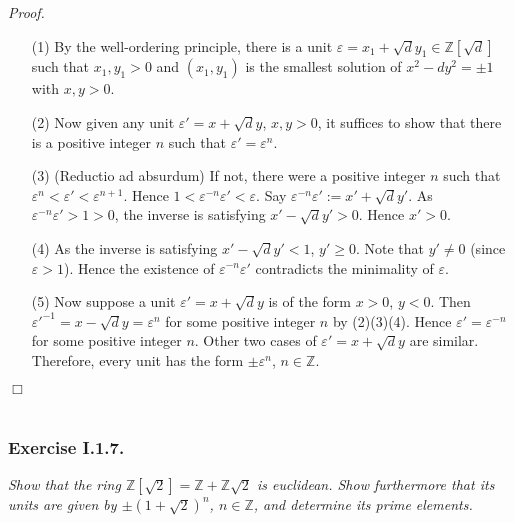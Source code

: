 \documentclass{article}
\begin{document}
\emph{Proof.}
\begin{enumerate}
\item[(1)]
  By the well-ordering principle,
  there is a unit $\varepsilon = x_1 + \sqrt{d}y_1 \in \mathbb{Z}[\sqrt{d}]$ such that
  $x_1, y_1 > 0$ and $(x_1,y_1)$ is the smallest solution of $x^2 - dy^2 = \pm 1$ with $x, y > 0$.

\item[(2)]
  Now given any unit $\varepsilon' = x + \sqrt{d}y$, $x, y > 0$,
  it suffices to show that there is a positive integer $n$ such that $\varepsilon' = \varepsilon^n$.

\item[(3)]
  (Reductio ad absurdum)
  If not, there were a positive integer $n$ such that $\varepsilon^n < \varepsilon' < \varepsilon^{n+1}$.
  Hence $1 < \varepsilon^{-n} \varepsilon' < \varepsilon$.
  Say $\varepsilon^{-n} \varepsilon' := x' + \sqrt{d}y'$.
  As $\varepsilon^{-n} \varepsilon' > 1 > 0$, the inverse is satisfying $x' - \sqrt{d}y' > 0$.
  Hence $x' > 0$.

\item[(4)]
  As the inverse is satisfying $x' - \sqrt{d}y' < 1$, $y' \geq 0$.
  Note that $y' \neq 0$ (since $\varepsilon > 1$).
  Hence the existence of $\varepsilon^{-n} \varepsilon'$ contradicts the minimality of $\varepsilon$.

\item[(5)]
  Now suppose a unit $\varepsilon' = x + \sqrt{d}y$ is of the form $x > 0$, $y < 0$.
  Then $\varepsilon'^{-1} = x - \sqrt{d}y = \varepsilon^n$ for some positive integer $n$ by (2)(3)(4).
  Hence $\varepsilon' = \varepsilon^{-n}$ for some positive integer $n$.
  Other two cases of $\varepsilon' = x + \sqrt{d}y$ are similar.
  Therefore, every unit has the form $\pm \varepsilon^n$, $n \in \mathbb{Z}$.
\end{enumerate}
$\Box$ \\\\






\subsubsection*{Exercise I.1.7.}
\emph{Show that the ring $\mathbb{Z}[\sqrt{2}] = \mathbb{Z} + \mathbb{Z}\sqrt{2}$ is euclidean.
Show furthermore that its units are given by $\pm(1+\sqrt{2})^n$, $n \in \mathbb{Z}$,
and determine its prime elements.} \\
\end{document}
